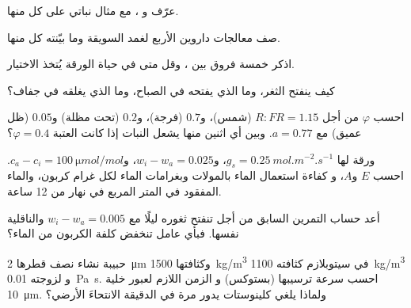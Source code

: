 \begin{exercise}[$\star$]\label{exo:b2:plant-plasticity:1}
عرّف    و
، مع مثال نباتي على كل منها.
\end{exercise}

\begin{exercise}[$\star$]\label{exo:b2:plant-plasticity:2}
صف معالجات داروين الأربع لغمد السويقة وما بيّنته كل منها.
\end{exercise}

\begin{exercise}[$\star$]\label{exo:b2:plant-plasticity:3}
اذكر خمسة فروق بين  ، وقل
متى في حياة الورقة يُتخذ الاختيار.
\end{exercise}

\begin{exercise}[$\star$]\label{exo:b2:plant-plasticity:4}
كيف ينفتح الثغر، وما الذي يفتحه في الصباح، وما الذي يغلقه
في جفاف؟
\end{exercise}

\begin{exercise}[$\star\star$]\label{exo:b2:plant-plasticity:5}
احسب $\varphi$ من أجل $R{:}FR = 1.15$ (شمس)، و$0.7$ (فرجة)، و$0.2$
(تحت مظلة) و$0.05$ (ظل عميق) مع $a = 0.77$. وبين
أي اثنين منها يشعل النبات  إذا كانت
العتبة $\varphi = 0.4$؟
\end{exercise}

\begin{exercise}[$\star\star$]\label{exo:b2:plant-plasticity:6}
ورقة لها $g_s = \qty{0.25}{mol.m^{-2}.s^{-1}}$، و$w_i - w_a = 0.025$،
و$c_a - c_i = \qty{100}{\micro mol/mol}$. احسب $E$ و$A$، و
كفاءة استعمال الماء بالمولات وبغرامات الماء لكل غرام
كربون، والماء المفقود في المتر المربع في نهار من 12 ساعة.
\end{exercise}

\begin{exercise}[$\star\star$]\label{exo:b2:plant-plasticity:7}
أعد حساب التمرين السابق من أجل  تنفتح ثغوره
ليلًا مع $w_i - w_a = 0.005$ والناقلية نفسها. فبأي
عامل تنخفض كلفة الكربون من الماء؟
\end{exercise}

\begin{exercise}[$\star\star$]\label{exo:b2:plant-plasticity:8}
 حبيبة نشاء نصف قطرها \qty{2}{\micro m} وكثافتها
\qty{1500}{kg/m^3} في سيتوبلازم كثافته \qty{1100}{kg/m^3} و
لزوجته \qty{0.01}{Pa.s}. احسب سرعة ترسيبها (بستوكس) و
الزمن اللازم لعبور خلية \qty{10}{\micro m}. ولماذا يلغي كلينوستات
يدور مرة في الدقيقة الانتحاءَ الأرضي؟
\end{exercise}

